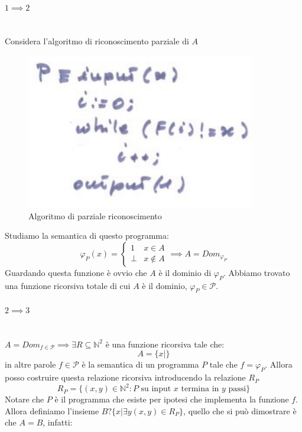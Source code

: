 \documentclass{article}
\begin{document}
\paragraph{$1\implies 2$}\mbox{}\\
Considera l'algoritmo di riconoscimento parziale di $A$
\begin{figure}[H]
    \centering
    \includegraphics[scale=0.6]{images/prog_ricors_rico.png}
    \caption{Algoritmo di parziale riconoscimento}
\end{figure}
Studiamo la semantica di questo programma:
\[
    \varphi_P(x)=
    \begin{cases}
        1    & x\in A    \\
        \bot & x\notin A
    \end{cases}
    \implies A =Dom_{\varphi_P}
\]
Guardando questa funzione è ovvio che $A$ è il dominio di $\varphi_P$. Abbiamo trovato una funzione
ricorsiva totale di cui $A$ è il dominio, $\varphi_P\in\mathcal{P}$.

\paragraph{$2\implies 3$}\mbox{}\\
$A=Dom_{f\in\mathcal{P}}\implies\exists R\subseteq\mathbb{N}^2$ è una funzione ricorsiva tale che:
$$A=\{x|\}$$
in altre parole $f\in\mathcal{P}$ è la semantica di un programma $P$ tale che $f=\varphi_P$.
Allora posso costruire questa relazione ricorsiva introducendo la relazione $R_P$
$$R_P=\{(x,y)\in\mathbb{N}^2:P\text{ su input }x\text{ termina in }y\text{ passi}\}$$
Notare che $P$ è il programma che esiste per ipotesi che implementa la funzione $f$. Allora
definiamo l'insieme $B?\{x|\exists y(x,y)\in R_P\}$, quello che si può dimostrare è che $A=B$,
infatti:
\end{document}

